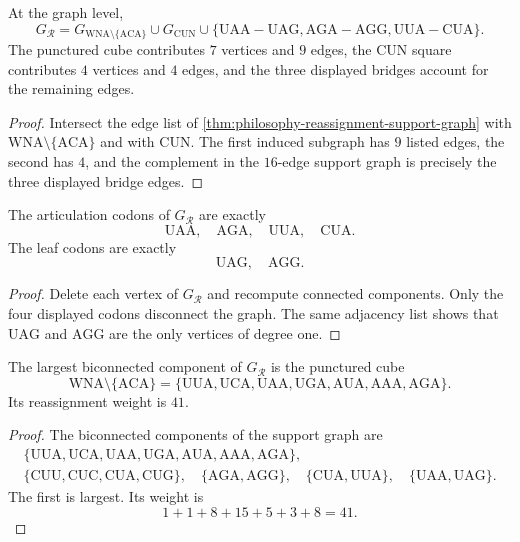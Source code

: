 \begin{theorem}
\label{thm:philosophy-cube-complex-edge-decomposition}
At the graph level,
$$
  G_{\mathcal{R}}
  =
  G_{\mathrm{WNA}\setminus\{\mathrm{ACA}\}}
  \cup
  G_{\mathrm{CUN}}
  \cup
  \{\mathrm{UAA}{-}\mathrm{UAG},
    \mathrm{AGA}{-}\mathrm{AGG},
    \mathrm{UUA}{-}\mathrm{CUA}\}.
$$
The punctured cube contributes $7$ vertices and $9$ edges, the CUN
square contributes $4$ vertices and $4$ edges, and the three displayed
bridges account for the remaining edges.
\end{theorem}
\begin{proof}
Intersect the edge list of
\autoref{thm:philosophy-reassignment-support-graph} with
$\mathrm{WNA}\setminus\{\mathrm{ACA}\}$ and with $\mathrm{CUN}$. The
first induced subgraph has $9$ listed edges, the second has $4$, and
the complement in the $16$-edge support graph is precisely the three
displayed bridge edges.
\end{proof}

\begin{theorem}
\label{thm:philosophy-reassignment-articulation-gates}
The articulation codons of $G_{\mathcal{R}}$ are exactly
$$
  \mathrm{UAA},\quad \mathrm{AGA},\quad \mathrm{UUA},\quad \mathrm{CUA}.
$$
The leaf codons are exactly
$$
  \mathrm{UAG},\quad \mathrm{AGG}.
$$
\end{theorem}
\begin{proof}
Delete each vertex of $G_{\mathcal{R}}$ and recompute connected
components. Only the four displayed codons disconnect the graph.
The same adjacency list shows that $\mathrm{UAG}$ and $\mathrm{AGG}$
are the only vertices of degree one.
\end{proof}

\begin{theorem}
\label{thm:philosophy-largest-biconnected-block}
The largest biconnected component of $G_{\mathcal{R}}$ is the punctured
cube
$$
  \mathrm{WNA}\setminus\{\mathrm{ACA}\}
  =
  \{\mathrm{UUA},\mathrm{UCA},\mathrm{UAA},\mathrm{UGA},
    \mathrm{AUA},\mathrm{AAA},\mathrm{AGA}\}.
$$
Its reassignment weight is $41$.
\end{theorem}
\begin{proof}
The biconnected components of the support graph are
$$
\begin{gathered}
  \{\mathrm{UUA},\mathrm{UCA},\mathrm{UAA},\mathrm{UGA},
    \mathrm{AUA},\mathrm{AAA},\mathrm{AGA}\},\\
  \{\mathrm{CUU},\mathrm{CUC},\mathrm{CUA},\mathrm{CUG}\},\quad
  \{\mathrm{AGA},\mathrm{AGG}\},\quad
  \{\mathrm{CUA},\mathrm{UUA}\},\quad
  \{\mathrm{UAA},\mathrm{UAG}\}.
\end{gathered}
$$
The first is largest. Its weight is
$$
  1+1+8+15+5+3+8=41.
$$
\end{proof}

